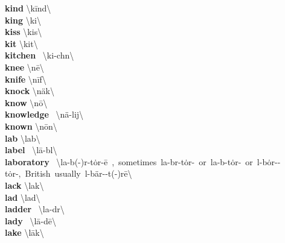 \documentclass[10pt,a4paper]{article}
\begin{document}
\begin{multicols}{2}
\textbf{ kind }\quad \textbackslash \textprimstress k\={i}nd\textbackslash \\
\textbf{ king }\quad \textbackslash \textprimstress ki\engma \textbackslash \\
\textbf{ kiss }\quad \textbackslash \textprimstress kis\textbackslash \\
\textbf{ kit }\quad \textbackslash \textprimstress kit\textbackslash \\
\textbf{ kitchen }\quad \ \textbackslash \textprimstress ki-ch\textschwa n\textbackslash \\
\textbf{ knee }\quad \textbackslash \textprimstress n\={e}\textbackslash \\
\textbf{ knife }\quad \textbackslash \textprimstress n\={i}f\textbackslash \\
\textbf{ knock }\quad \textbackslash \textprimstress n\"{a}k\textbackslash \\
\textbf{ know }\quad \textbackslash \textprimstress n\={o}\textbackslash \\
\textbf{ knowledge }\quad \ \textbackslash \textprimstress n\"{a}-lij\textbackslash \\
\textbf{ known }\quad \textbackslash \textprimstress n\={o}n\textbackslash \\
\textbf{ lab }\quad \textbackslash \textprimstress lab\textbackslash \\
\textbf{ label }\quad \ \textbackslash \textprimstress l\={a}-b\textschwa l\textbackslash \\
\textbf{ laboratory }\quad \ \textbackslash \textprimstress la-b(\textschwa -)r\textschwa -\textsecstress t\.{o}r-\={e}\ ,\ sometimes\ \textprimstress la-b\textschwa r-\textsecstress t\.{o}r-\ or\ \textprimstress la-b\textschwa -\textsecstress t\.{o}r-\ or\ l\textschwa -\textprimstress b\.{o}r-\textschwa -\textsecstress t\.{o}r-,\ British\ usually\ l\textschwa -\textprimstress b\"{a}r-\textschwa -t(\textschwa -)r\={e}\textbackslash \\
\textbf{ lack }\quad \textbackslash \textprimstress lak\textbackslash \\
\textbf{ lad }\quad \textbackslash \textprimstress lad\textbackslash \\
\textbf{ ladder }\quad \ \textbackslash \textprimstress la-d\textschwa r\textbackslash \\
\textbf{ lady }\quad \ \textbackslash \textprimstress l\={a}-d\={e}\textbackslash \\
\textbf{ lake }\quad \textbackslash \textprimstress l\={a}k\textbackslash \\

\end{multicols}
\end{document}
